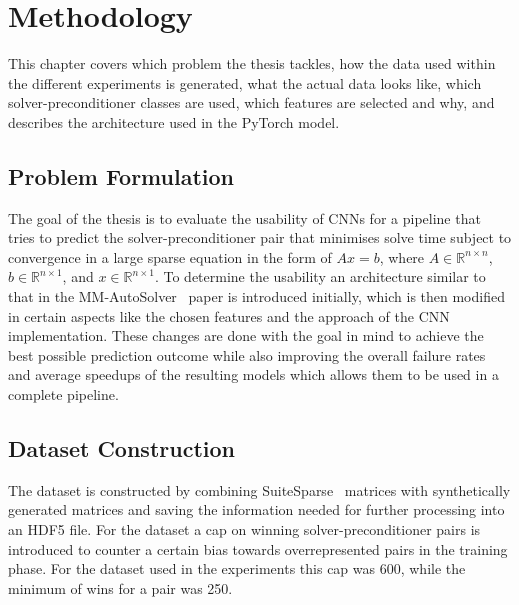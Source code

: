 
\chapter{Methodology}\label{chapter:methodology}

This chapter covers which problem the thesis tackles, how the data used within the different experiments is generated, what the actual data looks like,
which solver-preconditioner classes are used, which features are selected and why, and describes the architecture used in the PyTorch model.

\section{Problem Formulation}\label{sec:problem-formulation}

The goal of the thesis is to evaluate the usability of CNNs for a pipeline that tries to predict the solver-preconditioner
pair that minimises solve time subject to convergence in a large sparse equation in the form of $Ax = b$, where
$A \in \mathbb{R}^{n \times n}$, $b \in \mathbb{R}^{n \times 1}$, and $x \in \mathbb{R}^{n \times 1}$.
To determine the usability an architecture similar to that in the MM-AutoSolver~\cite{xiong2025mmautosolver} paper is introduced initially, which is
then modified in certain aspects like the chosen features and the approach of the CNN implementation.
These changes are done with the goal in mind to achieve the best possible prediction outcome while also improving the overall failure rates and average speedups
of the resulting models which allows them to be used in a complete pipeline.

\section{Dataset Construction}\label{sec:dataset}

The dataset is constructed by combining SuiteSparse~\cite{davis2011university} matrices with synthetically generated matrices and saving the information needed for
further processing into an HDF5 file.
For the dataset a cap on winning solver-preconditioner pairs is introduced to counter a certain bias towards overrepresented pairs in the training phase.
For the dataset used in the experiments this cap was 600, while the minimum of wins for a pair was 250.


